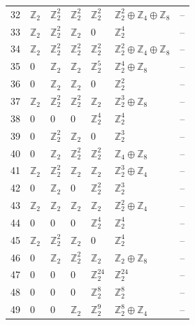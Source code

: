 \documentclass[10pt]{article}
\begin{document}
\begin{longtable}{rlllllr}
32 & $\mathbb{Z}_{2}$ & $\mathbb{Z}_{2}^{2}$ & $\mathbb{Z}_{2}^{2}$ & $\mathbb{Z}_{2}^{2}$ & $\mathbb{Z}_{2}^{2}\oplus \mathbb{Z}_{4}\oplus \mathbb{Z}_{8}$ & -- \\
33 & $\mathbb{Z}_{2}$ & $\mathbb{Z}_{2}^{2}$ & $\mathbb{Z}_{2}$ & $0$ & $\mathbb{Z}_{2}^{4}$ & -- \\
34 & $\mathbb{Z}_{2}$ & $\mathbb{Z}_{2}^{2}$ & $\mathbb{Z}_{2}^{2}$ & $\mathbb{Z}_{2}^{2}$ & $\mathbb{Z}_{2}^{2}\oplus \mathbb{Z}_{4}\oplus \mathbb{Z}_{8}$ & -- \\
35 & $0$ & $\mathbb{Z}_{2}$ & $\mathbb{Z}_{2}$ & $\mathbb{Z}_{2}^{5}$ & $\mathbb{Z}_{2}^{4}\oplus \mathbb{Z}_{8}$ & -- \\
36 & $0$ & $\mathbb{Z}_{2}$ & $\mathbb{Z}_{2}$ & $0$ & $\mathbb{Z}_{2}^{2}$ & -- \\
37 & $\mathbb{Z}_{2}$ & $\mathbb{Z}_{2}^{2}$ & $\mathbb{Z}_{2}^{2}$ & $\mathbb{Z}_{2}$ & $\mathbb{Z}_{2}^{3}\oplus \mathbb{Z}_{8}$ & -- \\
38 & $0$ & $0$ & $0$ & $\mathbb{Z}_{2}^{4}$ & $\mathbb{Z}_{2}^{4}$ & -- \\
39 & $0$ & $\mathbb{Z}_{2}^{2}$ & $\mathbb{Z}_{2}$ & $0$ & $\mathbb{Z}_{2}^{3}$ & -- \\
40 & $0$ & $\mathbb{Z}_{2}$ & $\mathbb{Z}_{2}^{2}$ & $\mathbb{Z}_{2}^{2}$ & $\mathbb{Z}_{4}\oplus \mathbb{Z}_{8}$ & -- \\
41 & $\mathbb{Z}_{2}$ & $\mathbb{Z}_{2}^{2}$ & $\mathbb{Z}_{2}$ & $\mathbb{Z}_{2}$ & $\mathbb{Z}_{2}^{3}\oplus \mathbb{Z}_{4}$ & -- \\
42 & $0$ & $\mathbb{Z}_{2}$ & $0$ & $\mathbb{Z}_{2}^{2}$ & $\mathbb{Z}_{2}^{3}$ & -- \\
43 & $\mathbb{Z}_{2}$ & $\mathbb{Z}_{2}$ & $\mathbb{Z}_{2}$ & $\mathbb{Z}_{2}$ & $\mathbb{Z}_{2}^{2}\oplus \mathbb{Z}_{4}$ & -- \\
44 & $0$ & $0$ & $0$ & $\mathbb{Z}_{2}^{4}$ & $\mathbb{Z}_{2}^{4}$ & -- \\
45 & $\mathbb{Z}_{2}$ & $\mathbb{Z}_{2}^{2}$ & $\mathbb{Z}_{2}$ & $0$ & $\mathbb{Z}_{2}^{4}$ & -- \\
46 & $0$ & $\mathbb{Z}_{2}$ & $\mathbb{Z}_{2}^{2}$ & $\mathbb{Z}_{2}$ & $\mathbb{Z}_{2}\oplus \mathbb{Z}_{8}$ & -- \\
47 & $0$ & $0$ & $0$ & $\mathbb{Z}_{2}^{24}$ & $\mathbb{Z}_{2}^{24}$ & -- \\
48 & $0$ & $0$ & $0$ & $\mathbb{Z}_{2}^{8}$ & $\mathbb{Z}_{2}^{8}$ & -- \\
49 & $0$ & $0$ & $\mathbb{Z}_{2}$ & $\mathbb{Z}_{2}^{9}$ & $\mathbb{Z}_{2}^{8}\oplus \mathbb{Z}_{4}$ & -- \\

\end{longtable}
\end{document}
